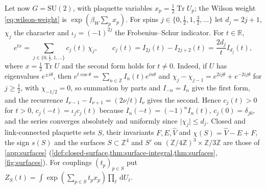 \documentclass[11pt,a4paper]{amsart}
\theoremstyle{definition}
\theoremstyle{remark}
\numberwithin{equation}{section}
\DeclareMathOperator{\Tr}{Tr}        %
\newcommand{\R}{\mathbb{R}}          %
\newcommand{\Z}{\mathbb{Z}}          %
\newcommand{\abs}[1]{\lvert #1\rvert}      %
\newcommand{\dd}{\,\mathrm{d}}             %
\newcommand{\SU}{\mathrm{SU}}              %
\newcommand{\betaW}{\beta_{W}}             %
\begin{document}
Let now $G=\SU(2)$, with plaquette variables $x_p=\frac12\Tr U_p$; the Wilson weight \eqref{eq:wilson-weight} is $\exp(\betaW\sum_px_p)$. For spins $j\in\{0,\frac12,1,\frac32,\dots\}$ let $d_j=2j+1$, $\chi_j$ the character and $\iota_j=(-1)^{2j}$ the Frobenius--Schur indicator. For $t\in\R$,
\begin{equation}\label{eq:su2-character-expansion}
e^{tx}=\sum_{j\in\{0,\frac12,1,\dots\}}c_j(t)\,\chi_j,\qquad c_j(t)=I_{2j}(t)-I_{2j+2}(t)=\frac{2d_j}{t}I_{d_j}(t),
\end{equation}
where $x=\frac12\Tr U$ and the second form holds for $t\ne0$. Indeed, if $U$ has eigenvalues $e^{\pm i\theta}$, then $e^{t\cos\theta}=\sum_{n\in\Z}I_n(t)e^{in\theta}$ and $\chi_j-\chi_{j-1}=e^{2ij\theta}+e^{-2ij\theta}$ for $j\ge\frac12$, with $\chi_{-1/2}=0$, so summation by parts and $I_{-n}=I_n$ give the first form, and the recurrence $I_{\nu-1}-I_{\nu+1}=(2\nu/t)I_\nu$ gives the second. Hence $c_j(t)>0$ for $t>0$, $c_j(-t)=\iota_jc_j(t)$ because $I_n(-t)=(-1)^nI_n(t)$, $c_j(0)=\delta_{j0}$, and the series converges absolutely and uniformly since $\abs{\chi_j}\le d_j$. Closed and link-connected plaquette sets $S$, their invariants $F,E,\hat V$ and $\chi(S)=\hat V-E+F$, the sign $s(S)$ and the surfaces $S\subset\Z^4$ and $S'$ on $(\Z/4\Z)^3\times\Z/3\Z$ are those of \cref{app:surfaces} (\cref{def:closed-surface,thm:surface-integral,thm:surfaces}, \cref{fig:surfaces}). For couplings $(t_p)_{p\in S}$ put $Z_S(t)=\int\exp(\sum_{p\in S}t_px_p)\prod_\ell\dd U_\ell$.
\end{document}
